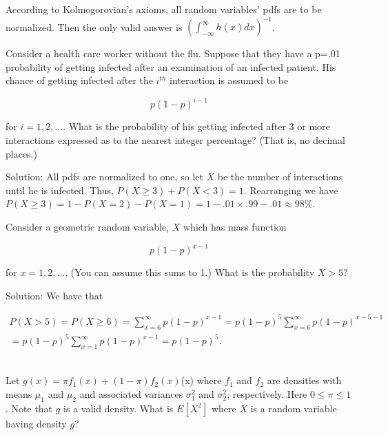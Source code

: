 \documentclass{homework}
\begin{document}
According to Kolmogorovian's axioms, all random variables' pdfs are to be normalized. Then the only valid answer is $ \left( \int_{-\infty}^\infty h(x)dx \right)^{-1}$. \\

\begin{tcolorbox}[title=Question 9]
Consider a health care worker without the flu. Suppose that they have a p=.01 probability of getting infected after an examination of an infected patient. His chance of getting infected after the $i^{th}$ interaction is assumed to be 

$$p(1-p)^{i-1}$$ 

for $i=1, 2, \ldots$. What is the probability of his getting infected after 3 or more interactions expressed as to the nearest integer percentage? (That is, no decimal places.)

\end{tcolorbox}

Solution: All pdfs are normalized to one, so let 
$X$ be the number of interactions until he is infected. Thus, $P(X \geq 3) + P(X < 3) = 1$. Rearranging we have $ P(X \geq 3) = 1 - P(X = 2) - P(X = 1) = 1 - .01 \times .99 - .01 \approx 98\%$. \\ 

\begin{tcolorbox}[title=Question 10]
Consider a geometric random variable, $X$ which has mass function

$$p(1-p)^{x-1}$$ 

for $x=1,2,\ldots$. (You can assume this sums to 1.) What is the probability $X > 5$? 
\end{tcolorbox}

Solution: We have that 

\begin{align*}
P(X>5)=P(X\geq6)=\sum_{x=6}^{\infty} p(1-p)^{x-1} 
= p(1-p)^{5} \sum_{x=6}^{\infty} p(1-p)^{x-5-1} \\= p(1-p)^{5} \sum_{x=1}^{\infty} p(1-p)^{x-1} =p(1-p)^{5}.
\end{align*} \\

\begin{tcolorbox}[title=Question 11]
Let $g(x) = \pi f_1(x) + (1 - \pi)f_2(x)$(x) where $f_1$ and $f_2$ are densities with means $\mu_1$ and $\mu_2$ and associated variances $\sigma_1^2$ and $\sigma_2^2$, respectively. Here $0 \leq \pi \leq 1$. Note that $g$ is a valid density. What is $E[X^2]$ where $X$ is a random variable having density $g$?
\end{tcolorbox}
\end{document}
